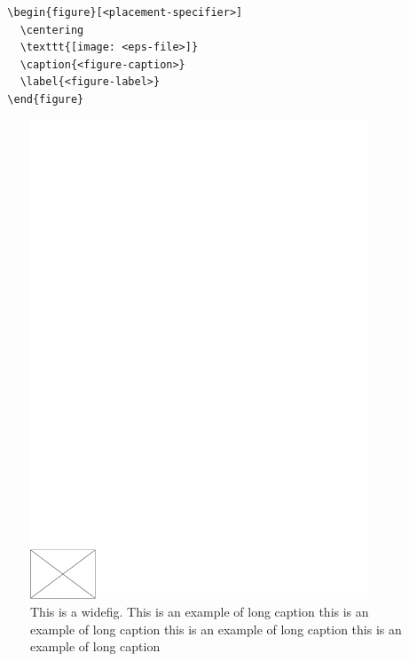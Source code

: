 \documentclass[pdflatex,sn-mathphys]{sn-jnl}%
\theoremstyle{thmstyleone}%
\theoremstyle{thmstyletwo}%
\theoremstyle{thmstylethree}%
\begin{document}
\bigskip
\begin{verbatim}
  \begin{figure}[<placement-specifier>]
    \centering
    \texttt{[image: <eps-file>]}
    \caption{<figure-caption>}
    \label{<figure-label>}
  \end{figure}
\end{verbatim}
\bigskip

\begin{figure}[h]%
  \centering
  \includegraphics[width=0.9\textwidth]{./empty}
  \caption{This is a widefig. This is an example of long caption this is an example of long caption  this is an example of long caption this is an example of long caption}
  \label{fig:fig1}
\end{figure}
\end{document}
